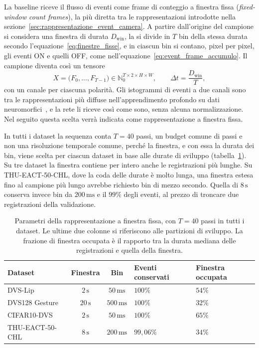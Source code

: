 La baseline riceve il flusso di eventi come frame di conteggio a finestra fissa (\emph{fixed-window count frames}), la più diretta tra le rappresentazioni introdotte nella sezione~\ref{sec:rappresentazione_event_camera}. A partire dall'origine del campione si considera una finestra di durata $D_{\mathrm{win}}$, la si divide in $T$ bin della stessa durata secondo l'equazione~\eqref{eq:finestre_fisse}, e in ciascun bin si contano, pixel per pixel, gli eventi ON e quelli OFF, come nell'equazione~\eqref{eq:event_frame_accumulo}. Il campione diventa così un tensore
\begin{equation}
\label{eq:input_baseline}
X=\bigl(F_0,\ldots,F_{T-1}\bigr)\in\mathbb N_0^{T\times2\times H\times W},
\qquad
\Delta t=\frac{D_{\mathrm{win}}}{T},
\end{equation}
con un canale per ciascuna polarità. Gli istogrammi di eventi a due canali sono tra le rappresentazioni più diffuse nell'apprendimento profondo su dati neuromorfici~\cite{maqueda2018event,gallego2022event}, e la rete li riceve così come sono, senza alcuna normalizzazione. Nel seguito questa scelta verrà indicata come rappresentazione a finestra fissa.

In tutti i dataset la sequenza conta $T=40$ passi, un budget comune di passi e non una risoluzione temporale comune, perché la finestra, e con essa la durata dei bin, viene scelta per ciascun dataset in base alle durate di sviluppo (tabella~\ref{tab:finestre_input}). Su tre dataset la finestra contiene per intero anche le registrazioni più lunghe. Su THU-EACT-50-CHL, dove la coda delle durate è molto lunga, una finestra estesa fino al campione più lungo avrebbe richiesto bin di mezzo secondo. Quella di $8\,\mathrm{s}$ conserva invece bin da $200\,\mathrm{ms}$ e il $99\%$ degli eventi, al prezzo di troncare due registrazioni della validazione.

\begin{table}[t]
\centering
\small
\renewcommand{\arraystretch}{1.2}
\caption[Parametri della rappresentazione a finestra fissa]{Parametri della rappresentazione a finestra fissa, con $T=40$ passi in tutti i dataset. Le ultime due colonne si riferiscono alle partizioni di sviluppo. La frazione di finestra occupata è il rapporto tra la durata mediana delle registrazioni e quella della finestra.}
\label{tab:finestre_input}
\begin{tabularx}{\textwidth}{@{}>{\raggedright\arraybackslash}X c c >{\centering\arraybackslash}p{2.0cm} >{\centering\arraybackslash}p{2.0cm}@{}}
\hline
\textbf{Dataset} & \textbf{Finestra} & \textbf{Bin} & \textbf{Eventi conservati} & \textbf{Finestra occupata} \\
\hline
DVS-Lip & $2\,\mathrm{s}$ & $50\,\mathrm{ms}$ & $100\%$ & $54\%$ \\
DVS128 Gesture & $20\,\mathrm{s}$ & $500\,\mathrm{ms}$ & $100\%$ & $32\%$ \\
CIFAR10-DVS & $2\,\mathrm{s}$ & $50\,\mathrm{ms}$ & $100\%$ & $65\%$ \\
THU-EACT-50-CHL & $8\,\mathrm{s}$ & $200\,\mathrm{ms}$ & $99{,}06\%$ & $34\%$ \\
\hline
\end{tabularx}
\end{table}

